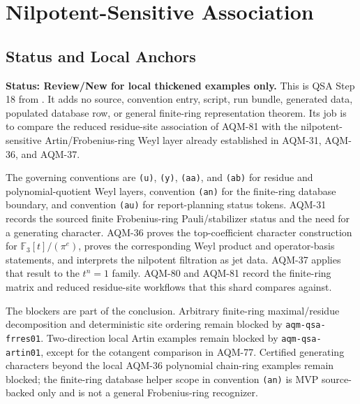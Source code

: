 
\section{Nilpotent-Sensitive Association}
\label{sec:qsa-nilpotent-sensitive-association}

\subsection{Status and Local Anchors}

\textbf{Status: Review/New for local thickened examples only.}  This is QSA
Step 18 from .  It adds no
source, convention entry, script, run bundle, generated data, populated
database row, or general finite-ring representation theorem.  Its job is to
compare the reduced residue-site association of AQM-81 with the
nilpotent-sensitive Artin/Frobenius-ring Weyl layer already established in
AQM-31, AQM-36, and AQM-37.

The governing conventions are \texttt{(u)}, \texttt{(y)}, \texttt{(aa)}, and
\texttt{(ab)} for residue and polynomial-quotient Weyl layers, convention
\texttt{(an)} for the finite-ring database boundary, and convention
\texttt{(au)} for report-planning status tokens.  AQM-31 records the sourced
finite Frobenius-ring Pauli/stabilizer status and the need for a generating
character.  AQM-36 proves the top-coefficient character construction for
\(\mathbb F_3[t]/(\pi^e)\), proves the corresponding Weyl product and
operator-basis statements, and interprets the nilpotent filtration as jet
data.  AQM-37 applies that result to the \(t^n=1\) family.  AQM-80 and
AQM-81 record the finite-ring matrix and reduced residue-site workflows that
this shard compares against.

The blockers are part of the conclusion.  Arbitrary finite-ring
maximal/residue decomposition and deterministic site ordering remain blocked
by \texttt{aqm-qsa-frres01}.  Two-direction local Artin examples remain
blocked by \texttt{aqm-qsa-artin01}, except for the cotangent comparison in
AQM-77.  Certified generating characters beyond the local AQM-36 polynomial
chain-ring examples remain blocked; the finite-ring database helper scope in
convention \texttt{(an)} is MVP source-backed only and is not a general
Frobenius-ring recognizer.

